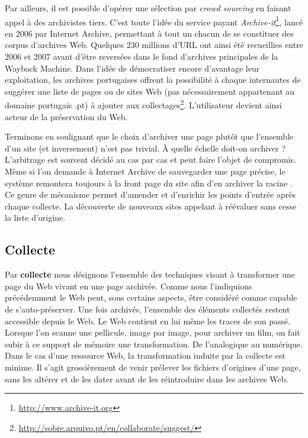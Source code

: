 \documentclass[symmetric,justified,marginals=raggedouter]{tufte-book}
\begin{document}
Par ailleurs, il est possible d'opérer une sélection par \textit{crowd sourcing} en faisant appel à des archivistes tiers. C'est toute l'idée du service payant \textit{Archive-it}\footnote{\RaggedOuter \url{http://www.archive-it.org}}, lancé en 2006 par Internet Archive, permettant à tout un chacun de se constituer des corpus d'archives Web. Quelques 230 millions d'URL ont ainsi été recueillies entre 2006 et 2007 avant d'être reversées dans le fond d'archives principales de la Wayback Machine. Dans l'idée de démocratiser encore d'avantage leur exploitation, les archives portugaises offrent la possibilité à chaque internautes de suggérer une liste de pages ou de sites Web (pas nécessairement appartenant au domaine portugais .pt) à ajouter aux  collectages\footnote{\RaggedOuter \url{http://sobre.arquivo.pt/en/collaborate/suggest/}}. L'utilisateur devient ainsi acteur de la préservation du Web.

Terminons en soulignant que le choix d'archiver une page plutôt que l'ensemble d'un site (et inversement) n'est pas trivial. À quelle échelle doit-on archiver ? L'arbitrage est souvent décidé au cas par cas et peut faire l'objet de compromis. Même si l'on demande à Internet Archive de sauvegarder une page précise, le système remontera toujours à la front page du site afin d'en archiver la racine  \citep{kimpton_year-by-year:_2006}. Ce genre de mécanisme permet d'amender et d'enrichir les points d'entrée après chaque collecte. La découverte de nouveaux sites appelant à réévaluer sans cesse la liste d'origine.    

\subsection{Collecte}

\noindent Par \textbf{collecte} nous désignons l'ensemble des techniques visant à transformer une page du Web vivant en une page archivée. Comme nous l'indiquions précédemment le Web peut, sous certains aspects, être considéré comme capable de s'auto-préserver. Une fois archivés, l'ensemble des éléments collectés restent accessible depuis le Web. Le Web contient en lui même les traces de son passé. Lorsque l'on scanne une pellicule, image par image, pour archiver un film, on fait subir à ce support de mémoire une transformation. De l'analogique au numérique. Dans le cas d'une ressource Web, la transformation induite par la collecte est minime. Il s'agit grossièrement de venir prélever les fichiers d'origines d'une page, sans les altérer et de les dater avant de les réintroduire dans les archives Web.     
\end{document}
